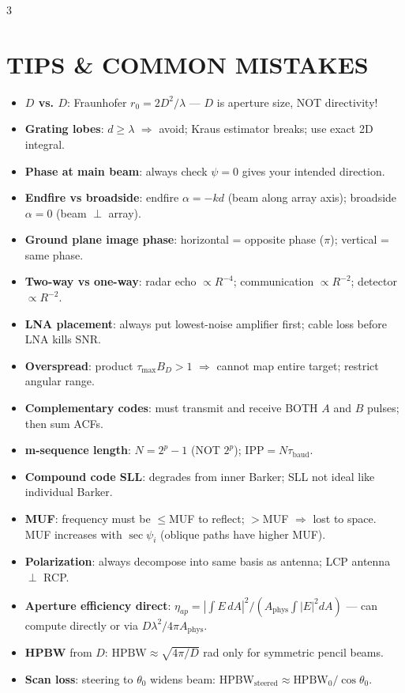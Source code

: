 \documentclass[6pt,landscape]{article}
\begin{document}
\begin{multicols}{3}
\section*{TIPS \& COMMON MISTAKES}
\begin{itemize}
\item \textbf{$D$ vs. $D$}: Fraunhofer $r_0=2D^2/\lambda$ — $D$ is aperture size, NOT directivity!
\item \textbf{Grating lobes}: $d\geq\lambda$ $\Rightarrow$ avoid; Kraus estimator breaks; use exact 2D integral.
\item \textbf{Phase at main beam}: always check $\psi=0$ gives your intended direction.
\item \textbf{Endfire vs broadside}: endfire $\alpha=-kd$ (beam along array axis); broadside $\alpha=0$ (beam $\perp$ array).
\item \textbf{Ground plane image phase}: horizontal = opposite phase ($\pi$); vertical = same phase.
\item \textbf{Two-way vs one-way}: radar echo $\propto R^{-4}$; communication $\propto R^{-2}$; detector $\propto R^{-2}$.
\item \textbf{LNA placement}: always put lowest-noise amplifier first; cable loss before LNA kills SNR.
\item \textbf{Overspread}: product $\tau_\text{max}B_D>1$ $\Rightarrow$ cannot map entire target; restrict angular range.
\item \textbf{Complementary codes}: must transmit and receive BOTH $A$ and $B$ pulses; then sum ACFs.
\item \textbf{m-sequence length}: $N=2^p-1$ (NOT $2^p$); IPP$=N\tau_\text{baud}$.
\item \textbf{Compound code SLL}: degrades from inner Barker; SLL not ideal like individual Barker.
\item \textbf{MUF}: frequency must be $\leq$MUF to reflect; $>$MUF $\Rightarrow$ lost to space. MUF increases with $\sec\psi_i$ (oblique paths have higher MUF).
\item \textbf{Polarization}: always decompose into same basis as antenna; LCP antenna $\perp$ RCP.
\item \textbf{Aperture efficiency direct}: $\eta_{ap}=|\int E\,dA|^2/(A_\text{phys}\int|E|^2 dA)$ — can compute directly or via $D\lambda^2/4\pi A_\text{phys}$.
\item \textbf{HPBW} from $D$: $\text{HPBW}\approx\sqrt{4\pi/D}$ rad only for symmetric pencil beams.
\item \textbf{Scan loss}: steering to $\theta_0$ widens beam: HPBW$_\text{steered}\approx\text{HPBW}_0/\cos\theta_0$.
\end{itemize}

\end{multicols}
\end{document}
